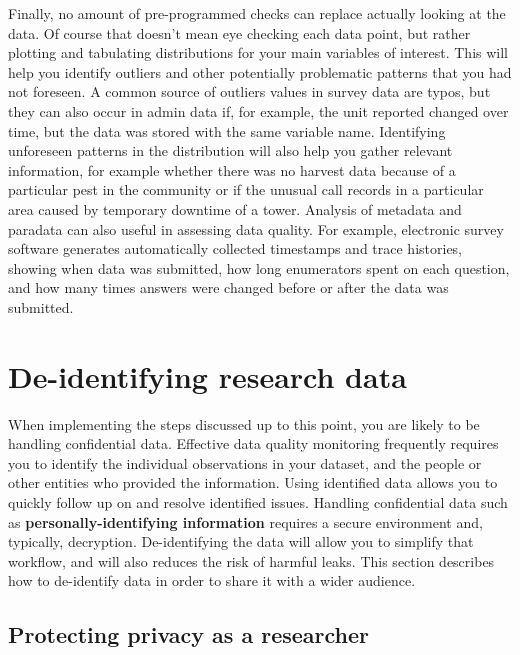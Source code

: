 Finally, no amount of pre-programmed checks can replace actually looking at the data.
Of course that doesn't mean eye checking each data point,
but rather plotting and tabulating distributions for your main variables of interest.
This will help you identify outliers and 
other potentially problematic patterns that you had not foreseen.
A common source of outliers values in survey data are typos,
but they can also occur in admin data if, for example,
the unit reported changed over time, 
but the data was stored with the same variable name.
Identifying unforeseen patterns in the distribution will also help you gather relevant information,
for example whether there was no harvest data because of a particular pest in the community
or if the unusual call records in a particular area caused by temporary downtime of a tower.
Analysis of metadata and paradata can also useful in assessing data quality.
For example, electronic survey software generates
automatically collected timestamps and trace histories,
showing when data was submitted, how long enumerators spent on each question,
and how many times answers were changed before or after the data was submitted.

\section{De-identifying research data}

When implementing the steps discussed up to this point,
you are likely to be handling confidential data.
Effective data quality monitoring
frequently requires you to identify the individual observations in your dataset,
and the people or other entities who provided the information.
Using identified data allows you to quickly follow up on and resolve identified issues.
Handling confidential data such as
\textbf{personally-identifying information}
requires a secure environment and, typically, decryption.
De-identifying the data will allow you to simplify that workflow,
and will also reduces the risk of harmful leaks.
This section describes how to de-identify data in order to share it with a wider audience.

\subsection{Protecting privacy as a researcher}

